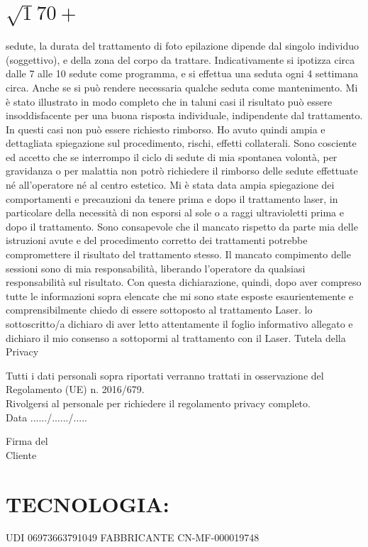 \documentclass[10pt]{article}
\begin{document}
\section{$\sqrt{1} 70+$}
sedute, la durata del trattamento di foto epilazione dipende dal singolo individuo (soggettivo), e della zona del corpo da trattare. Indicativamente si ipotizza circa dalle 7 alle 10 sedute come programma, e si effettua una seduta ogni 4 settimana circa. Anche se si può rendere necessaria qualche seduta come mantenimento. Mi è stato illustrato in modo completo che in taluni casi il risultato può essere insoddisfacente per una buona risposta individuale, indipendente dal trattamento. In questi casi non può essere richiesto rimborso. Ho avuto quindi ampia e dettagliata spiegazione sul procedimento, rischi, effetti collaterali. Sono cosciente ed accetto che se interrompo il ciclo di sedute di mia spontanea volontà, per gravidanza o per malattia non potrò richiedere il rimborso delle sedute effettuate né all'operatore né al centro estetico. Mi è stata data ampia spiegazione dei comportamenti e precauzioni da tenere prima e dopo il trattamento laser, in particolare della necessità di non esporsi al sole o a raggi ultravioletti prima e dopo il trattamento. Sono consapevole che il mancato rispetto da parte mia delle istruzioni avute e del procedimento corretto dei trattamenti potrebbe compromettere il risultato del trattamento stesso. Il mancato compimento delle sessioni sono di mia responsabilità, liberando l'operatore da qualsiasi responsabilità sul risultato. Con questa dichiarazione, quindi, dopo aver compreso tutte le informazioni sopra elencate che mi sono state esposte esaurientemente e comprensibilmente chiedo di essere sottoposto al trattamento Laser. lo sottoscritto/a dichiaro di aver letto attentamente il foglio informativo allegato e dichiaro il mio consenso a sottopormi al trattamento con il Laser. Tutela della Privacy

Tutti i dati personali sopra riportati verranno trattati in osservazione del Regolamento (UE) n. 2016/679.\\
Rivolgersi al personale per richiedere il regolamento privacy completo.\\
Data ....../....../.....

Firma del\\
Cliente

\section{TECNOLOGIA:}
UDI 06973663791049 FABBRICANTE CN-MF-000019748
\end{document}
